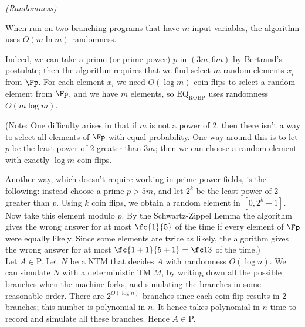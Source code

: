 \pagebreak

\begin{problem}{\it(Randomness)}

When run on two branching programs that have $m$ input variables, the algorithm uses $O(m\ln m)$ randomness.

Indeed, we can take a prime (or prime power) $p$ in $(3m,6m)$ by Bertrand's postulate; then the algorithm requires that we find select $m$ random elements $x_i$ from $\Fp$. For each element $x_i$ we need $O(\log m)$ coin flips to select a random element from $\Fp$, and we have $m$ elements, so $\text{EQ}_{\text{ROBP}}$ uses randomness $O(m\log m)$.

(Note: One difficulty arises in that if $m$ is not a power of 2, then there isn't a way to select all elements of $\Fp$ with equal probability. One way around this is to let $p$ be the least power of 2 greater than $3m$; then we can choose a random element with exactly $\log m$ coin flips.

Another way, which doesn't require working in prime power fields, is the following: instead choose a prime $p>5m$, and let $2^k$ be the least power of 2 greater than $p$. Using $k$ coin flips, we obtain a random element in $[0,2^k-1]$. Now take this element modulo $p$. By the Schwartz-Zippel Lemma the algorithm gives the wrong answer for at most $\fc{1}{5}$ of the time if every element of $\Fp$ were equally likely. Since some elements are twice as likely, the algorithm gives the wrong answer for at most $\fc{1+1}{5+1}=\fc13$ of the time.)\\

 Let $A\in $P. Let $N$ be a NTM that decides $A$ with randomness $O(\log n)$. We can simulate $N$ with a deterministic TM $M$, by writing down all the possible branches when the machine forks, and simulating the branches in some reasonable order. There are $2^{O(\log n)}$ branches since each coin flip results in 2 branches; this number is polynomial in $n$. It hence takes polynomial in $n$ time to record and simulate all these branches. Hence $A\in $P.
\end{problem}

\pagebreak

